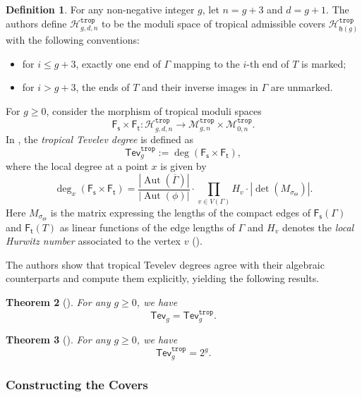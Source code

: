 \documentclass[11pt,reqno]{amsart}
\newtheorem{theorem}{Theorem}[section]
\theoremstyle{definition}
\newtheorem{definition}[theorem]{Definition}
\newcommand\trop{{\mathtt{trop}}}
\DeclareMathOperator{\Aut}{\mathrm Aut}
\newcommand\Mgn[1]{\mathcal M_{#1}}
\newcommand\Hur[1]{\mathcal H_{#1}}
\newcommand{\Ft}{\mathsf{F_t}}
\newcommand{\Fs}{\mathsf{F_s}}
\newcommand{\Tev}{{\mathsf{Tev}}}
\begin{document}
\begin{definition}
\label{admtrop}
For any non-negative integer $g$, let $n=g+3$ and $d=g+1$. The authors define
$\Hur{g,d,n}^\trop$ to be the moduli space of tropical admissible covers
$\Hur{\mathfrak{h}(g)}^\trop$ with the following conventions:
\begin{itemize}
    \item for $i \le g+3$, exactly one end of $\Gamma$ mapping to the $i$-th end
    of $T$ is marked;
    \item for $i > g+3$, the ends of $T$ and their inverse images in $\Gamma$
    are unmarked.
\end{itemize}
\end{definition}

For $g \ge 0$, consider the morphism of tropical moduli spaces
\[
\Fs \times \Ft \colon
\Hur{g,d,n}^\trop
\longrightarrow
\Mgn{g,n}^\trop \times \Mgn{0,n}^\trop .
\]
In \cite[Section~3]{troptev}, the \emph{tropical Tevelev degree} is defined as
\[
\Tev_g^\trop := \deg(\Fs \times \Ft),
\]
where the local degree at a point $x$ is given by
\begin{equation}
\label{eq:locdegforlater}
\deg_x(\Fs \times \Ft)
=
\frac{|\Aut(\overline{\Gamma})|}{|\Aut(\phi)|}
\cdot
\prod_{v \in V(\Gamma)} H_v
\cdot
\left| \det(M_{\sigma_\Theta}) \right|.
\end{equation}
Here $M_{\sigma_\Theta}$ is the matrix expressing the lengths of the compact
edges of $\Fs(\Gamma)$ and $\Ft(T)$ as linear functions of the edge lengths of
$\Gamma$ and $H_v$ denotes the {\it local Hurwitz number} associated to the vertex $v$ (\cite[Section 3.2.4]{CMRadmissible}).

The authors show that tropical Tevelev degrees agree with their algebraic
counterparts and compute them explicitly, yielding the following results.

\begin{theorem}[{\cite[Theorem~1.1]{troptev}}]
\label{thm:correspondence}
For any $g \ge 0$, we have
\[
\Tev_g = \Tev_g^\trop .
\]
\end{theorem}

\begin{theorem}[{\cite[Theorem~1.2]{troptev}}]
\label{thm:ttev}
For any $g \ge 0$, we have
\[
\Tev_g^\trop = 2^g .
\]
\end{theorem}

\subsubsection{Constructing the Covers}
\label{sec:constructing-covers}
\end{document}
